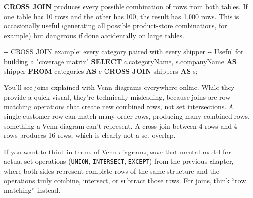 \documentclass[
  letterpaper,
  DIV=11,
  numbers=noendperiod]{scrreprt}
\newenvironment{Shaded}{\begin{snugshade}}{\end{snugshade}}
\newcommand{\CommentTok}[1]{\textcolor[rgb]{0.37,0.37,0.37}{#1}}
\newcommand{\KeywordTok}[1]{\textcolor[rgb]{0.00,0.23,0.31}{\textbf{#1}}}
\newcommand{\NormalTok}[1]{\textcolor[rgb]{0.00,0.23,0.31}{#1}}
\begin{document}
\textbf{CROSS JOIN} produces every possible combination of rows from
both tables. If one table has 10 rows and the other has 100, the result
has 1,000 rows. This is occasionally useful (generating all possible
product-store combinations, for example) but dangerous if done
accidentally on large tables.

\begin{codelisting}

\caption{\texttt{duckdb}}

\begin{Shaded}
\begin{Highlighting}[]
\CommentTok{{-}{-} CROSS JOIN example: every category paired with every shipper}
\CommentTok{{-}{-} Useful for building a "coverage matrix"}
\KeywordTok{SELECT}
\NormalTok{    c.categoryName,}
\NormalTok{    s.companyName }\KeywordTok{AS}\NormalTok{ shipper}
\KeywordTok{FROM}\NormalTok{ categories }\KeywordTok{AS}\NormalTok{ c}
\KeywordTok{CROSS} \KeywordTok{JOIN}\NormalTok{ shippers }\KeywordTok{AS}\NormalTok{ s;}
\end{Highlighting}
\end{Shaded}

\end{codelisting}

\begin{tcolorbox}[enhanced jigsaw, opacitybacktitle=0.6, arc=.35mm, colback=white, bottomtitle=1mm, opacityback=0, toprule=.15mm, left=2mm, colbacktitle=quarto-callout-warning-color!10!white, breakable, coltitle=black, toptitle=1mm, colframe=quarto-callout-warning-color-frame, bottomrule=.15mm, titlerule=0mm, title=\textcolor{quarto-callout-warning-color}{\faExclamationTriangle}\hspace{0.5em}{Joins Are Not Set Operations}, rightrule=.15mm, leftrule=.75mm]

You'll see joins explained with Venn diagrams everywhere online. While
they provide a quick visual, they're technically misleading, because
joins are row-matching operations that create new combined rows, not set
intersections. A single customer row can match many order rows,
producing many combined rows, something a Venn diagram can't represent.
A cross join between 4 rows and 4 rows produces 16 rows, which is
clearly not a set overlap.

If you want to think in terms of Venn diagrams, save that mental model
for actual set operations (\texttt{UNION}, \texttt{INTERSECT},
\texttt{EXCEPT}) from the previous chapter, where both sides represent
complete rows of the same structure and the operations truly combine,
intersect, or subtract those rows. For joins, think ``row matching''
instead.

\end{tcolorbox}
\end{document}
